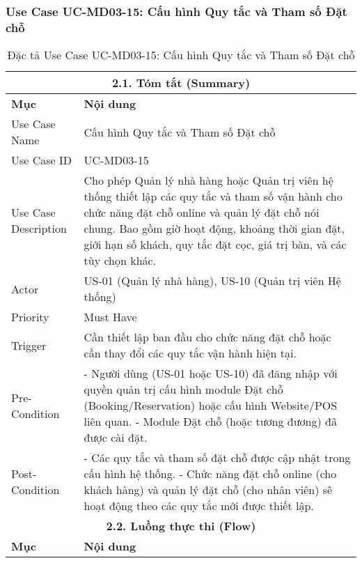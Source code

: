 \subsubsection{Use Case UC-MD03-15: Cấu hình Quy tắc và Tham số Đặt chỗ}
\begin{longtable}{|m{4cm}|p{11cm}|}
\caption{Đặc tả Use Case UC-MD03-15: Cấu hình Quy tắc và Tham số Đặt chỗ} \label{tab:uc_md03_15_revised_v3} \\
\hline
\multicolumn{2}{|c|}{\textbf{2.1. Tóm tắt (Summary)}} \\
\hline
\textbf{Mục} & \textbf{Nội dung} \\
\hline
\endhead %
\hline
\endfoot %
\hline
\endlastfoot %
Use Case Name & Cấu hình Quy tắc và Tham số Đặt chỗ \\
\hline
Use Case ID & UC-MD03-15 \\
\hline
Use Case Description & Cho phép Quản lý nhà hàng hoặc Quản trị viên hệ thống thiết lập các quy tắc và tham số vận hành cho chức năng đặt chỗ online và quản lý đặt chỗ nói chung. Bao gồm giờ hoạt động, khoảng thời gian đặt, giới hạn số khách, quy tắc đặt cọc, giá trị bàn, và các tùy chọn khác. \\
\hline
Actor & US-01 (Quản lý nhà hàng), US-10 (Quản trị viên Hệ thống) \\
\hline
Priority & Must Have \\
\hline
Trigger & Cần thiết lập ban đầu cho chức năng đặt chỗ hoặc cần thay đổi các quy tắc vận hành hiện tại. \\
\hline
Pre-Condition & - Người dùng (US-01 hoặc US-10) đã đăng nhập với quyền quản trị cấu hình module Đặt chỗ (Booking/Reservation) hoặc cấu hình Website/POS liên quan. \newline - Module Đặt chỗ (hoặc tương đương) đã được cài đặt. \\
\hline
Post-Condition & - Các quy tắc và tham số đặt chỗ được cập nhật trong cấu hình hệ thống. \newline - Chức năng đặt chỗ online (cho khách hàng) và quản lý đặt chỗ (cho nhân viên) sẽ hoạt động theo các quy tắc mới được thiết lập. \\
\hline
\multicolumn{2}{|c|}{\textbf{2.2. Luồng thực thi (Flow)}} \\
\hline
\textbf{Mục} & \textbf{Nội dung} \\
\hline

\end{longtable}
